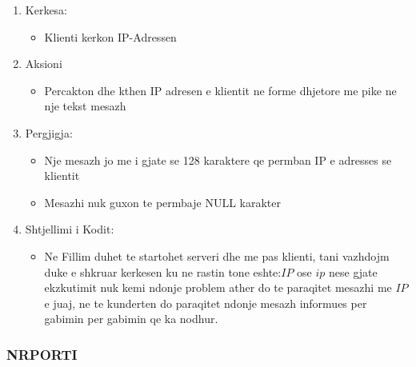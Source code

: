 \documentclass[]{article}
\begin{document}
\begin{enumerate}
\item Kerkesa:
\begin{itemize}
\item Klienti kerkon IP-Adressen
\end{itemize}
\item Aksioni
\begin{itemize}
\item Percakton dhe kthen IP adresen e klientit ne forme dhjetore
me pike ne nje tekst mesazh
\end{itemize}
\item Pergjigja:
\begin{itemize}
\item Nje mesazh jo me i gjate se 128 karaktere qe permban IP e adresses se klientit
\item Mesazhi nuk guxon te permbaje NULL karakter

\end{itemize}
\item Shtjellimi i Kodit:
\begin{itemize}
\item Ne Fillim duhet te startohet serveri dhe me pas klienti, tani vazhdojm  duke e shkruar kerkesen ku ne rastin tone eshte:$IP$ ose $ip$ nese gjate ekzkutimit nuk kemi ndonje problem ather do te paraqitet mesazhi me $IP$ e juaj, ne te kunderten do paraqitet ndonje mesazh informues per gabimin per gabimin qe ka nodhur.
\end{itemize}
\end{enumerate}
\newpage

\subsubsection{NRPORTI}
\end{document}
